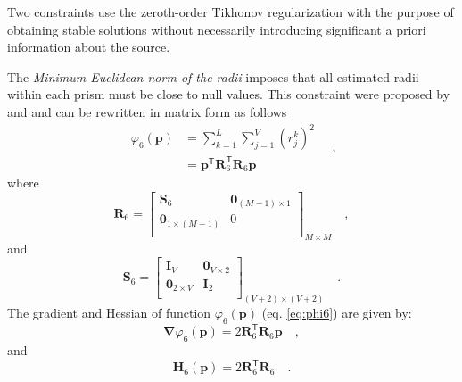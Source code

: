 Two constraints use the zeroth-order Tikhonov regularization with the purpose of obtaining stable solutions without necessarily introducing significant a priori information about the source. 

The \textit{Minimum Euclidean norm of the radii} imposes that 
all estimated radii within each prism must be close to null values. This constraint were proposed by \cite{oliveirajr-etal2011} and \cite{oliveirajr-barbosa2013} and can be rewritten in matrix form as follows
\begin{equation}\label{eq:phi6}
\begin{split}
\varphi_{6}(\mathbf{p}) &= \sum\limits^{L}_{k=1}\sum\limits^{V}_{j=1}\left(r_{j}^{k}\right)^2 \\
&= \mathbf{p}^{\mathsf{T}} \mathbf{R}_{6}^{\mathsf{T}} \mathbf{R}_{6} \mathbf{p}
\end{split} \quad ,
\end{equation}
where
\begin{equation}
\mathbf{R}_{6} = 
\begin{bmatrix}
\mathbf{S}_{6} & \mathbf{0}_{(M-1) \times 1} \\
\mathbf{0}_{1 \times (M-1)} & 0 \\
\end{bmatrix}_{M\times M} \quad ,
\label{eq:R6-matrix}
\end{equation}
and 
\begin{equation}
\mathbf{S}_{6} = 
\begin{bmatrix}
\mathbf{I}_{V} & \mathbf{0}_{V \times 2} \\
\mathbf{0}_{2 \times V} & \mathbf{I}_{2} \\
\end{bmatrix}_{ (V+2)\times (V+2)} \quad .
\label{eq:S6-matrix}
\end{equation}
The gradient and Hessian of function $\varphi_{6}(\mathbf{p})$ (eq. \ref{eq:phi6}) are given by:
\begin{equation}\label{eq:phi6_grad}
\boldsymbol{\nabla}\varphi_{6}(\mathbf{p}) = 2 \mathbf{R}_{6}^{\mathsf{T}} \mathbf{R}_{6} \mathbf{p} \quad ,
\end{equation}
and
\begin{equation}\label{eq:phi6_hessian}
\mathbf{H}_{6}(\mathbf{p}) = 2 \mathbf{R}^{\mathsf{T}}_{6}\mathbf{R}_{6} \quad .
\end{equation}

